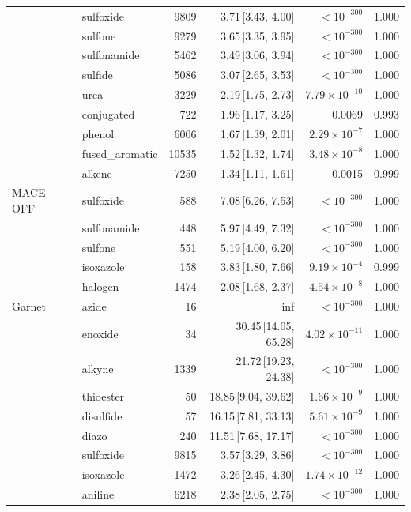 \begin{table}[t]
\begin{tabular}{llrrrr}
      & sulfoxide & 9809 & 3.71\,[3.43, 4.00] & $< 10^{-300}$ & 1.000 \\
      & sulfone & 9279 & 3.65\,[3.35, 3.95] & $< 10^{-300}$ & 1.000 \\
      & sulfonamide & 5462 & 3.49\,[3.06, 3.94] & $< 10^{-300}$ & 1.000 \\
      & sulfide & 5086 & 3.07\,[2.65, 3.53] & $< 10^{-300}$ & 1.000 \\
      & urea & 3229 & 2.19\,[1.75, 2.73] & $7.79\times 10^{-10}$ & 1.000 \\
      & conjugated & 722 & 1.96\,[1.17, 3.25] & 0.0069 & 0.993 \\
      & phenol & 6006 & 1.67\,[1.39, 2.01] & $2.29\times 10^{-7}$ & 1.000 \\
      & fused\_aromatic & 10535 & 1.52\,[1.32, 1.74] & $3.48\times 10^{-8}$ & 1.000 \\
      & alkene & 7250 & 1.34\,[1.11, 1.61] & 0.0015 & 0.999 \\
    \hline
    MACE-OFF & sulfoxide & 588 & 7.08\,[6.26, 7.53] & $< 10^{-300}$ & 1.000 \\
      & sulfonamide & 448 & 5.97\,[4.49, 7.32] & $< 10^{-300}$ & 1.000 \\
      & sulfone & 551 & 5.19\,[4.00, 6.20] & $< 10^{-300}$ & 1.000 \\
      & isoxazole & 158 & 3.83\,[1.80, 7.66] & $9.19\times 10^{-4}$ & 0.999 \\
      & halogen & 1474 & 2.08\,[1.68, 2.37] & $4.54\times 10^{-8}$ & 1.000 \\
    \hline
    Garnet & azide & 16 & inf & $< 10^{-300}$ & 1.000 \\
      & enoxide & 34 & 30.45\,[14.05, 65.28] & $4.02\times 10^{-11}$ & 1.000 \\
      & alkyne & 1339 & 21.72\,[19.23, 24.38] & $< 10^{-300}$ & 1.000 \\
      & thioester & 50 & 18.85\,[9.04, 39.62] & $1.66\times 10^{-9}$ & 1.000 \\
      & disulfide & 57 & 16.15\,[7.81, 33.13] & $5.61\times 10^{-9}$ & 1.000 \\
      & diazo & 240 & 11.51\,[7.68, 17.17] & $< 10^{-300}$ & 1.000 \\
      & sulfoxide & 9815 & 3.57\,[3.29, 3.86] & $< 10^{-300}$ & 1.000 \\
      & isoxazole & 1472 & 3.26\,[2.45, 4.30] & $1.74\times 10^{-12}$ & 1.000 \\
      & aniline & 6218 & 2.38\,[2.05, 2.75] & $< 10^{-300}$ & 1.000 \\

\end{tabular}
\end{table}
